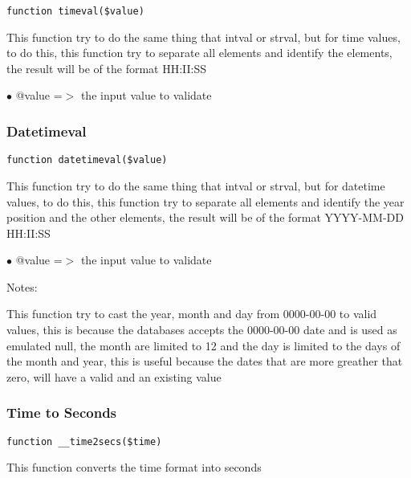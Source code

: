 \documentclass[a4paper]{article}
\begin{document}
\begin{lstlisting}
function timeval($value)
\end{lstlisting}

This function try to do the same thing that intval or strval, but for time
values, to do this, this function try to separate all elements and identify
the elements, the result will be of the format HH:II:SS

\begin{compactitem}
\item[\color{myblue}$\bullet$] @value =$>$ the input value to validate
\end{compactitem}

\hypertarget{toc106}{}
\subsubsection{Datetimeval}

\begin{lstlisting}
function datetimeval($value)
\end{lstlisting}

This function try to do the same thing that intval or strval, but for datetime
values, to do this, this function try to separate all elements and identify
the year position and the other elements, the result will be of the format
YYYY-MM-DD HH:II:SS

\begin{compactitem}
\item[\color{myblue}$\bullet$] @value =$>$ the input value to validate
\end{compactitem}

Notes:

This function try to cast the year, month and day from 0000-00-00 to valid
values, this is because the databases accepts the 0000-00-00 date and is used
as emulated null, the month are limited to 12 and the day is limited to the
days of the month and year, this is useful because the dates that are more
greather that zero, will have a valid and an existing value

\hypertarget{toc107}{}
\subsubsection{Time to Seconds}

\begin{lstlisting}
function __time2secs($time)
\end{lstlisting}

This function converts the time format into seconds
\end{document}
